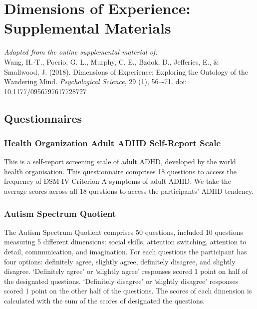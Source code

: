 
\appendix
\setcounter{chapter}{0}

\renewcommand{\chaptername}{Appendix}
\renewcommand{\theequation}{\Alph{chapter}.\arabic{section}.\arabic{equation}}
\setcounter{equation}{0}


\chapter{Dimensions of Experience: Supplemental Materials}
\label{appendix:study1}
\textit{Adapted from the online supplemental material of: }\\
Wang, H.-T., Poerio, G. L., Murphy, C. E., Bzdok, D., Jefferies, E., \& Smallwood, J. (2018). Dimensions of Experience: Exploring the Ontology of the Wandering Mind. \textit{Psychological Science}, 29 (1), 56–-71. doi: 10.1177/0956797617728727
\section{Questionnaires}
\label{appendix:study1:subsection1}

\subsection{Health Organization Adult ADHD Self-Report Scale}
This is a self-report screening scale of adult ADHD, developed by the world health organisation\cite{Kessler2005}. This questionnaire comprises 18 questions to access the frequency of DSM-IV Criterion A symptoms of adult ADHD. We take the average scores across all 18 questions to access the participants’ ADHD tendency.

\subsection{Autism Spectrum Quotient}
The Autism Spectrum Quotient \cite{Baron-Cohen2001} comprises 50 questions, included 10 questions measuring 5 different dimensions: social skills, attention switching, attention to detail, communication, and imagination. For each questions the participant has four options: definitely agree, slightly agree, definitely disagree, and slightly disagree. ‘Definitely agree’ or ‘slightly agree’ responses scored 1 point on half of the designated questions.  ‘Definitely disagree’ or ‘slightly disagree’ responses scored 1 point on the other half of the questions.  The scores of each dimension is calculated with the sum of the scores of designated the questions.

